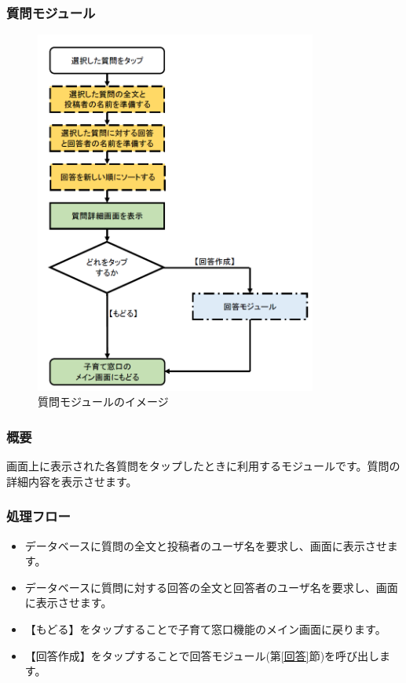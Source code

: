 \documentclass[a4j]{jarticle}
\begin{document}
\subsubsection{質問モジュール\label{質問}} %
\begin{figure}[H]
    \begin{center}
      \includegraphics[height = 12.0cm] {子育て窓口_質問.png} %
    \caption {質問モジュールのイメージ}
    \label{functionselection}
    \end{center}
\end{figure}
\subsubsection*{概要}
画面上に表示された各質問をタップしたときに利用するモジュールです。質問の詳細内容を表示させます。
\subsubsection*{処理フロー}
\begin{itemize}
\item データベースに質問の全文と投稿者のユーザ名を要求し、画面に表示させます。
\item データベースに質問に対する回答の全文と回答者のユーザ名を要求し、画面に表示させます。
\item 【もどる】をタップすることで子育て窓口機能のメイン画面に戻ります。
\item 【回答作成】をタップすることで回答モジュール(第\ref{回答}節)を呼び出します。

\end{itemize}
\end{document}
